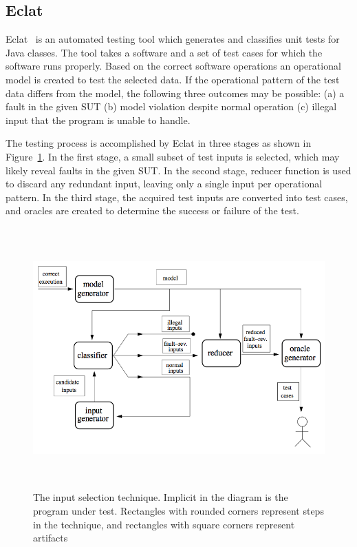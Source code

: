 \subsection{Eclat}
Eclat~\cite{pacheco2005eclat} is an automated testing tool which generates and classifies unit tests for Java classes. The tool takes a software and a set of test cases for which the software runs properly. Based on the correct software operations an operational model is created to test the selected data. If the operational pattern of the test data differs from the model, the following three outcomes may be possible: (a) a fault in the given SUT (b) model violation despite normal operation (c) illegal input that the program is unable to handle.

The testing process is accomplished by Eclat in three stages as shown in Figure~\ref{fig:eclat}. In the first stage, a small subset of test inputs is selected, which may likely reveal faults in the given SUT. In the second stage, reducer function is used to discard any redundant input, leaving only a single input per operational pattern. In the third stage, the acquired test inputs are converted into test cases, and oracles are created to determine the success or failure of the test.
\bigskip
\begin{figure}[h]
	\centering
	\includegraphics[width=14.5cm, height=10cm]{chapter2/eclat_working.png}
	\bigskip
	\caption{The input selection technique. Implicit in the diagram is the program under test. Rectangles with rounded corners represent steps in the technique, and rectangles with square corners represent artifacts~\cite{pacheco2005eclat}}
	\label{fig:eclat}
\end{figure}
\bigskip

